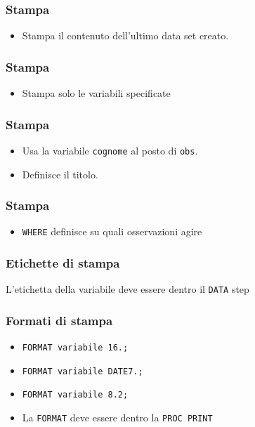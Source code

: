 \documentclass[12pt]{beamer}
\begin{document}
\begin{frame}[containsverbatim]\frametitle{Stampa}
  \begin{itemize}
  \item
    Stampa il contenuto dell'ultimo data set creato.
  \end{itemize}\end{frame}

\begin{frame}[containsverbatim]\frametitle{Stampa}
  \begin{itemize}
  \item
    Stampa solo le variabili specificate
  \end{itemize}\end{frame}

\begin{frame}[containsverbatim]\frametitle{Stampa}
  \begin{itemize}
  \item
    Usa la variabile \texttt{cognome} al posto di \texttt{obs}.
  \item
    Definisce il titolo.
  \end{itemize}\end{frame}

\begin{frame}[containsverbatim]\frametitle{Stampa}
  \begin{itemize}
  \item
    \verb+WHERE+ definisce su quali osservazioni agire
  \end{itemize}\end{frame}

\begin{frame}[containsverbatim]\frametitle{Etichette di stampa}

  \vspace{1em}
  L'etichetta della variabile deve essere dentro il \verb!DATA! step
\end{frame}




\begin{frame}[containsverbatim]\frametitle{Formati di stampa}
  \begin{itemize}
  \item
    \verb!FORMAT variabile 16.;!
  \item
    \verb!FORMAT variabile DATE7.;!
  \item
    \verb!FORMAT variabile 8.2;!
  \item
    La \verb!FORMAT! deve essere dentro la \verb!PROC PRINT!
  \end{itemize}
\end{frame}
\end{document}
